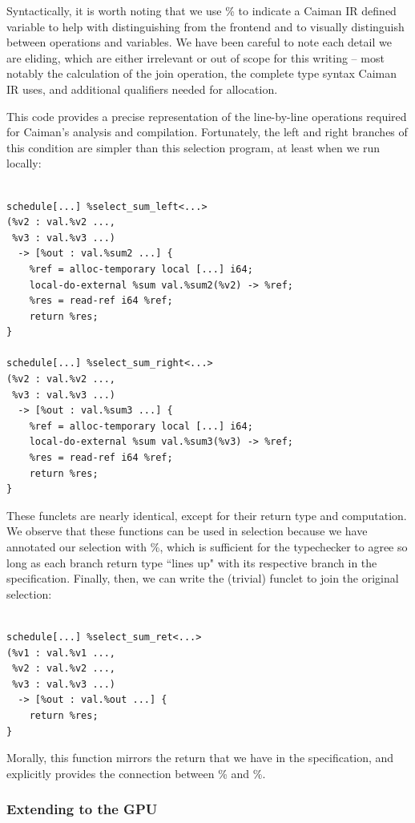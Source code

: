 Syntactically, it is worth noting that we use \% to indicate a Caiman IR defined variable to help with distinguishing from the frontend and to visually distinguish between operations and variables.  We have been careful to note each detail we are eliding, which are either irrelevant or out of scope for this writing -- most notably the calculation of the join operation, the complete type syntax Caiman IR uses, and additional qualifiers needed for allocation.

This code provides a precise representation of the line-by-line operations required for Caiman's analysis and compilation.  Fortunately, the left and right branches of this condition are simpler than this selection program, at least when we run locally:
%
\begin{lstlisting}

schedule[...] %select_sum_left<...>
(%v2 : val.%v2 ..., 
 %v3 : val.%v3 ...) 
  -> [%out : val.%sum2 ...] {
    %ref = alloc-temporary local [...] i64;
    local-do-external %sum val.%sum2(%v2) -> %ref;
    %res = read-ref i64 %ref;
    return %res;
}

schedule[...] %select_sum_right<...>
(%v2 : val.%v2 ..., 
 %v3 : val.%v3 ...) 
  -> [%out : val.%sum3 ...] {
    %ref = alloc-temporary local [...] i64;
    local-do-external %sum val.%sum3(%v3) -> %ref;
    %res = read-ref i64 %ref;
    return %res;
}
\end{lstlisting}
%
These funclets are nearly identical, except for their return type and computation.  We observe that these functions can be used in selection because we have annotated our selection with \%, which is sufficient for the typechecker to agree so long as each branch return type ``lines up" with its respective branch in the specification.  Finally, then, we can write the (trivial) funclet to join the original selection:
%
\begin{lstlisting}

schedule[...] %select_sum_ret<...>
(%v1 : val.%v1 ..., 
 %v2 : val.%v2 ..., 
 %v3 : val.%v3 ...) 
  -> [%out : val.%out ...] {
    return %res;
}
\end{lstlisting}
%
Morally, this function mirrors the return that we have in the specification, and explicitly provides the connection between \% and \%.

\subsubsection{Extending to the GPU}
\label{subsec:gpuir}

